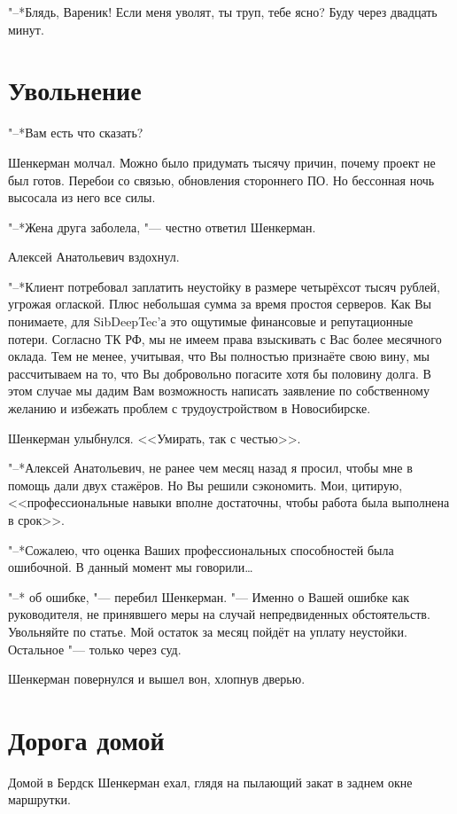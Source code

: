 "--*Блядь, Вареник!
Если меня уволят, ты труп, тебе ясно?
Буду через двадцать минут.

\section{Увольнение}


"--*Вам есть что сказать?

Шенкерман молчал.
Можно было придумать тысячу причин, почему проект не был готов.
Перебои со связью, обновления стороннего ПО.
Но бессонная ночь высосала из него все силы.

"--*Жена друга заболела, "--- честно ответил Шенкерман.

Алексей Анатольевич вздохнул.

"--*Клиент потребовал заплатить неустойку в размере четырёхсот тысяч рублей, угрожая оглаской.
Плюс небольшая сумма за время простоя серверов.
Как Вы понимаете, для SibDeepTec'а это ощутимые финансовые и репутационные потери.
Согласно ТК РФ, мы не имеем права взыскивать с Вас более месячного оклада.
Тем не менее, учитывая, что Вы полностью признаёте свою вину, мы рассчитываем на то, что Вы добровольно погасите хотя бы половину долга.
В этом случае мы дадим Вам возможность написать заявление по собственному желанию и избежать проблем с трудоустройством в Новосибирске.

Шенкерман улыбнулся.
<<Умирать, так с честью>>.

"--*Алексей Анатольевич, не ранее чем месяц назад я просил, чтобы мне в помощь дали двух стажёров.
Но Вы решили сэкономить.
Мои, цитирую, <<профессиональные навыки вполне достаточны, чтобы работа была выполнена в срок>>.

"--*Сожалею, что оценка Ваших профессиональных способностей была ошибочной.
В данный момент мы говорили\ldots

"--* \ldotst об ошибке, "--- перебил Шенкерман.
"--- Именно о Вашей ошибке как руководителя, не принявшего меры на случай непредвиденных обстоятельств.
Увольняйте по статье.
Мой остаток за месяц пойдёт на уплату неустойки.
Остальное "--- только через суд.

Шенкерман повернулся и вышел вон, хлопнув дверью.

\section{Дорога домой}


Домой в Бердск Шенкерман ехал, глядя на пылающий закат в заднем окне маршрутки.

